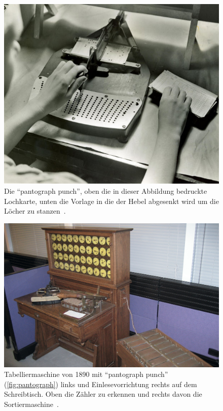\documentclass[parskip=half]{scrartcl}
\begin{document}
\begin{figure}[h]
  \centering
  \includegraphics[width=\textwidth]{pantograph}
  \caption{Die \enquote{pantograph punch}, oben die in dieser Abbildung
    bedruckte Lochkarte, unten die Vorlage in die der Hebel abgesenkt wird um
    die Löcher zu stanzen~\cite{pantograph}.}
  \label{fig:pantograph}
\end{figure}

\begin{figure}[h]
  \centering
  \includegraphics[width=\textwidth]{manuell}
  \caption{Tabelliermaschine von 1890 mit \enquote{pantograph punch}
    (\autoref{fig:pantograph}) links und Einlesevorrichtung rechts auf dem
    Schreibtisch. Oben die Zähler zu erkennen und rechts davon die
    Sortiermaschine~\cite{1890}.}
  \label{fig:1890}
\end{figure}
\end{document}
